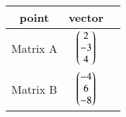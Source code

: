\begin{tabular}{|c|c|c|}
    \hline
    point & vector \\
    \hline
    Matrix A & $\begin{pmatrix}2\\-3\\4\end{pmatrix}$ \\
    \hline
    Matrix B & $\begin{pmatrix}-4\\6\\-8\end{pmatrix}$ \\
    \hline
\end{tabular}
